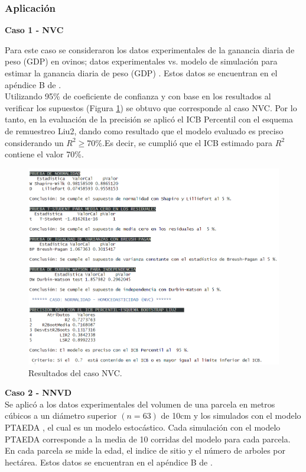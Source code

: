 \clearpage

\newpage

\subsubsection{Aplicación}

\textbf{Caso 1 - NVC}

Para este caso se consideraron los datos experimentales de la ganancia diaria de peso (GDP) en ovinos; datos experimentales vs. modelo de simulación para estimar la ganancia diaria de peso (GDP) \parencite{osorio-2011}. Estos datos se encuentran en el apéndice B de \textcite{balam-2012}.\\


Utilizando 95\% de coeficiente de confianza y con base en los resultados al verificar los supuestos (Figura \ref{fig:final_NVC_resultados}) se obtuvo que corresponde al caso NVC. Por lo tanto, en la evaluación de la precisión se aplicó el ICB Percentil con el esquema de remuestreo Liu2, dando como resultado que el modelo evaluado es preciso considerando un $R^2 \geq 70\%$.Es decir, se cumplió que el ICB estimado para $R^2$ contiene el valor 70\%.


\begin{figure}[ht!]
	\centering 
	\includegraphics[width=0.9\linewidth]{img/Uso_NVC_PropuestaFinal.png} 
	\caption{Resultados del caso NVC.}
	\label{fig:final_NVC_resultados}
\end{figure}
\FloatBarrier
\clearpage

\newpage

\textbf{Caso 2 - NNVD}\\
Se aplicó a los datos experimentales del volumen de una parcela en metros cúbicos a un diámetro superior $(n = 63)$ de 10cm y los simulados con el modelo PTAEDA \parencite{chung-1987}, el cual es un modelo estocástico. Cada simulación con el modelo PTAEDA corresponde a la media de 10 corridas del modelo para cada parcela. En cada parcela se mide la edad, el indice de sitio y el número de arboles por hectárea. Estos datos se encuentran en el apéndice B de \textcite{balam-2012}.\\


